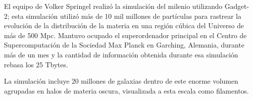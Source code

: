 \documentclass[a4paper,openright,12pt]{book}
\begin{document}
\begin{figure}
\end{figure}

El equipo de Volker Springel realizó la simulación del milenio \cite{3.0.3}utilizando Gadget-2; esta simulación utilizó más de 10 mil millones de partículas para rastrear la evolución de la distribución de la materia en una región cúbica del Universo de más de 500 Mpc. Mantuvo ocupado el superordenador principal en el Centro de Supercomputación de la Sociedad Max Planck en Garching, Alemania, durante más de un mes y la cantidad de información obtenida durante esa simulación rebasa los 25 Tbytes.

La simulación incluye 20 millones de galaxias dentro de este enorme volumen agrupadas en halos de materia oscura, visualizada a esta escala como filamentos.

\begin{figure}
\end{figure}
\end{document}
